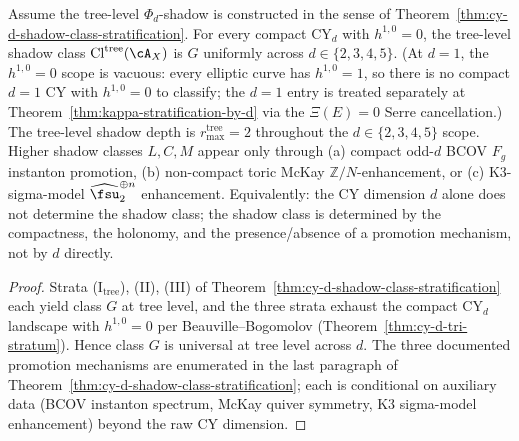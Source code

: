 \begin{corollary}
\label{cor:universal-tree-class-G}
Assume the tree-level \(\Phi_d\)-shadow is constructed in the sense of
Theorem~\ref{thm:cy-d-shadow-class-stratification}.
For every compact CY$_d$ with $h^{1, 0} = 0$, the tree-level shadow class
$\mathrm{Cl}^{\mathrm{tree}}(\cA_X)$ is $G$ uniformly across
$d \in \{2, 3, 4, 5\}$. (At $d = 1$, the $h^{1, 0} = 0$ scope is vacuous:
every elliptic curve has $h^{1, 0} = 1$, so there is no compact $d = 1$
CY with $h^{1, 0} = 0$ to classify; the $d = 1$ entry is treated
separately at Theorem~\ref{thm:kappa-stratification-by-d} via the
$\Xi(E) = 0$ Serre cancellation.)
The tree-level shadow depth is $r_{\max}^{\mathrm{tree}} = 2$
throughout the $d \in \{2, 3, 4, 5\}$ scope.
Higher shadow classes $L, C, M$ appear only through
\textup{(a)} compact odd-$d$ BCOV $F_g$ instanton promotion,
\textup{(b)} non-compact toric McKay $\mathbb{Z}/N$-enhancement, or
\textup{(c)} K3-sigma-model $\widehat{\fsu}_2^{\oplus n}$ enhancement.
Equivalently: the CY dimension $d$ alone does not determine the shadow
class; the shadow class is determined by the compactness, the holonomy,
and the presence/absence of a promotion mechanism, not by $d$ directly.
\end{corollary}

\begin{proof}
Strata (I$_{\mathrm{tree}}$), (II), (III) of
Theorem~\ref{thm:cy-d-shadow-class-stratification} each yield class $G$
at tree level, and the three strata exhaust the compact CY$_d$
landscape with $h^{1, 0} = 0$ per Beauville--Bogomolov
(Theorem~\ref{thm:cy-d-tri-stratum}). Hence class $G$ is universal at
tree level across $d$. The three documented promotion mechanisms are
enumerated in the last paragraph of
Theorem~\ref{thm:cy-d-shadow-class-stratification}; each is
conditional on auxiliary data (BCOV instanton spectrum, McKay quiver
symmetry, K3 sigma-model enhancement) beyond the raw CY dimension.
\end{proof}

